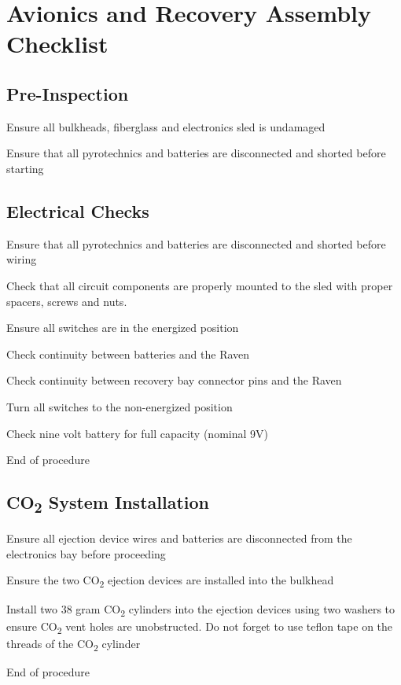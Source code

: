 \section{Avionics and Recovery Assembly Checklist}

    \subsection{Pre-Inspection}
        \begin{checklist}
            \item Ensure all bulkheads, fiberglass and electronics sled is undamaged
            \item Ensure that all pyrotechnics and batteries are disconnected and shorted before starting
        \end{checklist}

    \subsection{Electrical Checks}
        \begin{checklist}
            \item Ensure that all pyrotechnics and batteries are disconnected and shorted before wiring
            \item Check that all circuit components are properly mounted to the sled with proper spacers, screws and nuts.
            \item Ensure all switches are in the energized position
            \item Check continuity between batteries and the Raven
            \item Check continuity between recovery bay connector pins and the Raven
            \item Turn all switches to the non-energized position
            \item Check nine volt battery for full capacity (nominal 9V)
            \item End of procedure
        \end{checklist}

    \subsection{CO\textsubscript{2} System Installation}
        \begin{checklist}
            \item Ensure all ejection device wires and batteries are disconnected from the electronics bay before proceeding
            \item Ensure the two CO\textsubscript{2} ejection devices are installed into the bulkhead
            \item Install two 38 gram CO\textsubscript{2} cylinders into the ejection devices using two washers to ensure CO\textsubscript{2} vent holes are unobstructed. Do not forget to use teflon tape on the threads of the CO\textsubscript{2} cylinder
            \item End of procedure
        \end{checklist}


